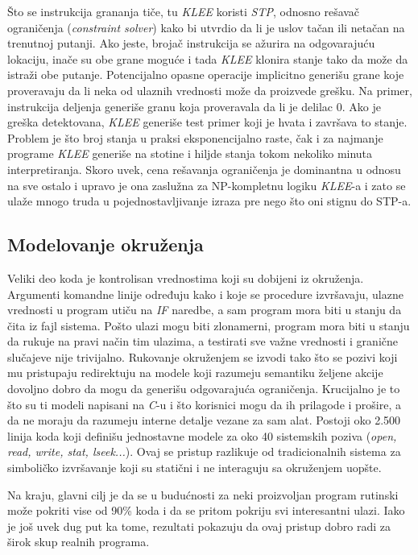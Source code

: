 \documentclass[a4paper]{article}
\begin{document}
{Što se instrukcija grananja tiče, tu \textit{KLEE} koristi \textit{STP}, odnosno rešavač ograničenja (\textit{constraint solver}) kako bi utvrdio da li je uslov tačan ili netačan na trenutnoj putanji. Ako jeste, brojač instrukcija se ažurira na odgovarajuću lokaciju, inače su obe grane moguće i tada \textit{KLEE} klonira stanje tako da može da istraži obe putanje. Potencijalno opasne operacije implicitno generišu grane koje proveravaju da li neka od ulaznih vrednosti može da proizvede grešku. Na primer, instrukcija deljenja generiše granu koja proveravala da li je delilac 0. Ako je greška detektovana, \textit{KLEE} generiše test primer koji je hvata i završava to stanje. 
Problem je što broj stanja u praksi eksponencijalno raste, čak i za najmanje programe \textit{KLEE} generiše na stotine i hiljde stanja tokom nekoliko minuta interpretiranja. Skoro uvek, cena rešavanja ograničenja je dominantna u odnosu na sve ostalo i upravo je ona zaslužna za NP-kompletnu logiku \textit{KLEE}-a i zato se ulaže mnogo truda u pojednostavljivanje izraza pre nego što oni stignu do STP-a.


\subsection{Modelovanje okruženja}
\label{subsec:podnaslovK}
Veliki deo koda je kontrolisan vrednostima koji su dobijeni iz okruženja. Argumenti komandne linije određuju kako i koje se procedure izvršavaju, ulazne vrednosti u program utiču na 
\textit{IF} naredbe, a sam program mora biti u stanju da čita iz fajl sistema. Pošto ulazi mogu biti zlonamerni, program mora biti u stanju da rukuje na pravi način tim ulazima, a testirati sve važne vrednosti i granične slučajeve nije trivijalno.
Rukovanje okruženjem se izvodi tako što se pozivi koji mu pristupaju redirektuju na modele koji razumeju semantiku željene akcije  dovoljno dobro da mogu da generišu odgovarajuća ograničenja. Krucijalno je to što su ti modeli napisani na \textit{C}-u i što korisnici mogu da ih prilagode i prošire, a da ne moraju da razumeju interne detalje vezane za sam alat. Postoji oko 2.500 linija koda koji definišu jednostavne modele za oko 40 sistemskih poziva (\textit{open, read, write, stat, lseek...}). Ovaj se pristup razlikuje od tradicionalnih 
sistema za simboličko izvršavanje koji su statični i ne interaguju sa okruženjem uopšte. 

Na kraju, glavni cilj je da se u budućnosti za neki proizvoljan program rutinski može pokriti vise od 90\% koda i da se pritom pokriju svi interesantni ulazi. Iako je još uvek dug put ka tome, rezultati pokazuju da ovaj pristup dobro radi za širok skup realnih programa. 

}
\end{document}
